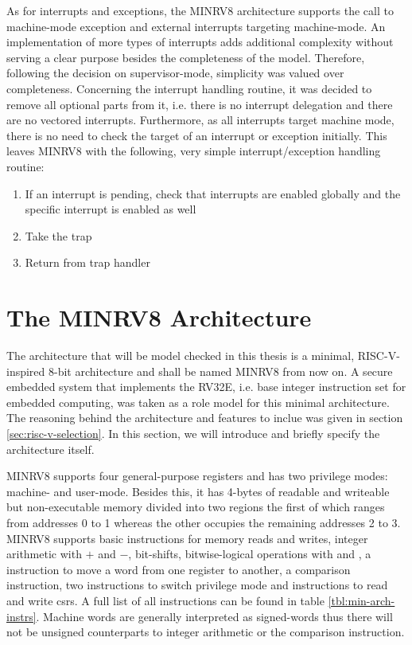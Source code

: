 As for interrupts and exceptions, the MINRV8 architecture supports the call to machine-mode exception and external interrupts targeting machine-mode.
An implementation of more types of interrupts adds additional complexity without serving a clear purpose besides the completeness of the model.
Therefore, following the decision on supervisor-mode, simplicity was valued over completeness.
Concerning the interrupt handling routine, it was decided to remove all optional parts from it, i.e. there is no interrupt delegation and there are no vectored interrupts.
Furthermore, as all interrupts target machine mode, there is no need to check the target of an interrupt or exception initially.
This leaves MINRV8 with the following, very simple interrupt/exception handling routine:
\begin{enumerate}
    \item If an interrupt is pending, check that interrupts are enabled globally and the specific interrupt is enabled as well
    \item Take the trap
    \item Return from trap handler
\end{enumerate}

\section{The MINRV8 Architecture}
\label{sec:minrv8}

The architecture that will be model checked in this thesis is a minimal, RISC-V-inspired 8-bit architecture and shall be named MINRV8 from now on.
A secure embedded system that implements the RV32E, i.e. base integer instruction set for embedded computing, was taken as a role model for this minimal architecture.
The reasoning behind the architecture and features to inclue was given in section \ref{sec:risc-v-selection}.
In this section, we will introduce and briefly specify the architecture itself.

MINRV8 supports four general-purpose registers and has two privilege modes: machine- and user-mode.
Besides this, it has 4-bytes of readable and writeable but non-executable memory divided into two regions the first of which ranges from addresses 0 to 1 whereas the other occupies the remaining addresses 2 to 3.
MINRV8 supports basic instructions for memory reads and writes, integer arithmetic with $ + $ and $ - $, bit-shifts, bitwise-logical operations with  and , a  instruction to move a word from one register to another, a comparison instruction, two instructions to switch privilege mode and instructions to read and write \glspl{csr}.
A full list of all instructions can be found in table \ref{tbl:min-arch-instrs}.
Machine words are generally interpreted as signed-words thus there will not be unsigned counterparts to integer arithmetic or the comparison instruction.

